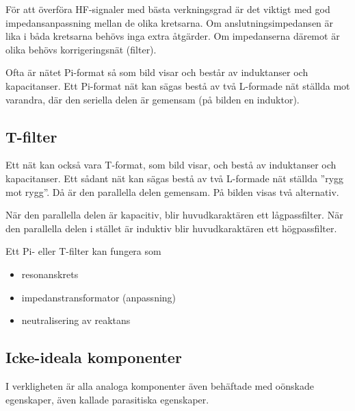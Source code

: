 
För att överföra HF-signaler med bästa verkningsgrad är det viktigt med god
impedansanpassning mellan de olika kretsarna.
Om anslutningsimpedansen är lika i båda kretsarna behövs inga extra åtgärder.
Om impedanserna däremot är olika behövs korrigeringsnät (filter).

Ofta är nätet Pi-format så som bild  visar och består av
induktanser och kapacitanser.
Ett Pi-format nät kan sägas bestå av två L-formade nät ställda mot varandra, där
den seriella delen är gemensam (på bilden en induktor).

\subsection{T-filter}


Ett nät kan också vara T-format, som bild  visar, och bestå
av induktanser och kapacitanser.
Ett sådant nät kan sägas bestå av två L-formade nät ställda ''rygg mot rygg''.
Då är den parallella delen gemensam.
På bilden visas två alternativ.

När den parallella delen är kapacitiv, blir huvudkaraktären ett lågpassfilter. 
När den parallella delen i stället är induktiv blir huvudkaraktären ett högpassfilter.

Ett Pi- eller T-filter kan fungera som
\begin{itemize}
  \item resonanskrets
  \item impedanstransformator (anpassning)
  \item neutralisering av reaktans
\end{itemize}

\subsection{Icke-ideala komponenter}

I verkligheten är alla analoga komponenter även behäftade med oönskade egenskaper,
även kallade parasitiska egenskaper.


